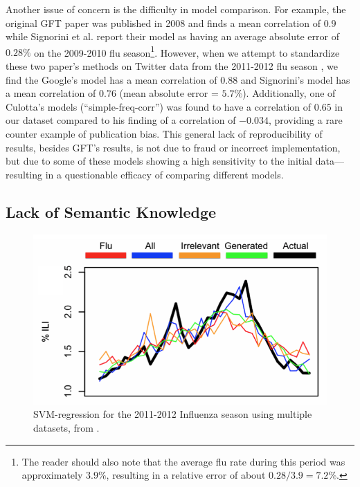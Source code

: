 Another issue of concern is the difficulty in model comparison. For example, the original GFT paper was published in 2008 \cite{gft} and finds a mean correlation of \(0.9\) while Signorini et al. \cite{signorini2011use} report their model as having an average absolute error of \(0.28\%\) on the 2009-2010 flu season\footnote{The reader should also note that the average flu rate during this period was approximately \(3.9\%\), resulting in a relative error of about \(0.28/3.9 = 7.2\%\).}. However, when we attempt to standardize these two paper's methods on Twitter data from the 2011-2012 flu season \cite{www2013}, we find the Google's model has a mean correlation of \(0.88\) and Signorini's model has a mean correlation of \(0.76\) (mean absolute error = \(5.7\%\)). Additionally, one of Culotta's \cite{culotta2010towards} models (``simple-freq-corr'') was found to have a correlation of \(0.65\) in our dataset compared to his finding of a correlation of \(-0.034\), providing a rare counter example of publication bias. This general lack of reproducibility of results, besides GFT's results, is not due to fraud or incorrect implementation, but due to some of these models showing a high sensitivity to the initial data---resulting in a questionable efficacy of comparing different models. 

\subsection{Lack of Semantic Knowledge}

\begin{figure}
\includegraphics{introduction/figures/www2013_svmr.png}
\caption[SVM-regression for the 2011-2012 Influenza season using multiple datasets.]{SVM-regression for the 2011-2012 Influenza season using multiple datasets, from \cite{www2013}.}
\label{fig:intro_www2013}
\end{figure}


